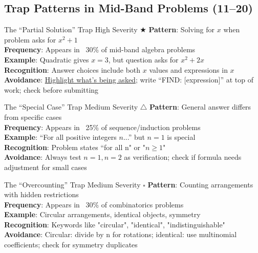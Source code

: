 \documentclass{article}
\begin{document}
\subsection{Trap Patterns in Mid-Band Problems (11--20)}

\begin{trapbox}{The ``Partial Solution'' Trap \colorbox{red!20}{High Severity} $\bigstar$}
\textbf{Pattern}: Solving for $x$ when problem asks for $x^2+1$\\
\textbf{Frequency}: Appears in ~30\% of mid-band algebra problems\\
\textbf{Example}: Quadratic gives $x=3$, but question asks for $x^2+2x$\\
\textbf{Recognition}: Answer choices include both $x$ values and expressions in $x$\\
\textbf{Avoidance}: \underline{Highlight what's being asked}; write ``FIND: [expression]'' at top of work; check before submitting
\end{trapbox}

\begin{trapbox}{The ``Special Case'' Trap \colorbox{orange!20}{Medium Severity} $\triangle$}
\textbf{Pattern}: General answer differs from specific cases\\
\textbf{Frequency}: Appears in ~25\% of sequence/induction problems\\
\textbf{Example}: ``For all positive integers $n$...'' but $n=1$ is special\\
\textbf{Recognition}: Problem states ``for all n" or "$n \geq 1$"\\
\textbf{Avoidance}: Always test $n=1, n=2$ as verification; check if formula needs adjustment for small cases
\end{trapbox}

\begin{trapbox}{The ``Overcounting'' Trap \colorbox{orange!20}{Medium Severity} $\square$}
\textbf{Pattern}: Counting arrangements with hidden restrictions\\
\textbf{Frequency}: Appears in ~30\% of combinatorics problems\\
\textbf{Example}: Circular arrangements, identical objects, symmetry\\
\textbf{Recognition}: Keywords like "circular", "identical", "indistinguishable"\\
\textbf{Avoidance}: Circular: divide by n for rotations; identical: use multinomial coefficients; check for symmetry duplicates
\end{trapbox}
\end{document}
